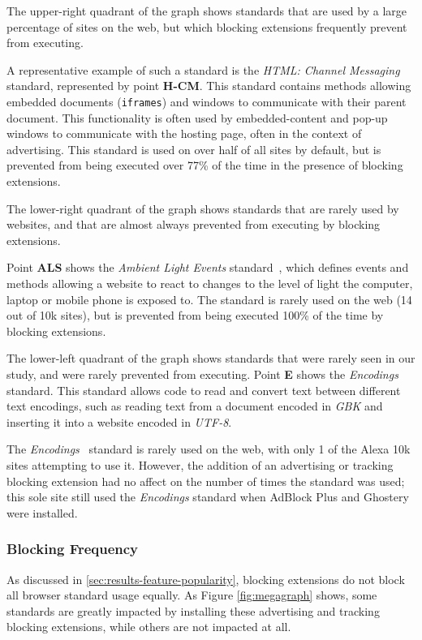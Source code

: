 The upper-right quadrant of the graph shows standards that are used by a
large percentage of sites on the web, but which blocking extensions frequently
prevent from executing.

A representative example of such a standard is the \textit{HTML: Channel Messaging}
~\cite{htmlcmw3c} standard, represented by point \textbf{H-CM}.  This standard
contains \JS methods allowing embedded documents (\texttt{iframes}) and windows
to communicate with their parent document.  This functionality is often used
by embedded-content and pop-up windows to communicate with the hosting page,
often in the context of advertising.  This standard is used on over half of
all sites by default, but is prevented from being executed over 77\% of the
time in the presence of blocking extensions.

The lower-right quadrant of the graph shows standards that are rarely used by
websites, and that are almost always prevented from executing by blocking extensions.

Point \textbf{ALS} shows the \emph{Ambient Light Events}
standard~\cite{ambientlightapi}, which defines events and methods allowing
a website to react to changes to the level of light the computer, laptop
or mobile phone is exposed to.  The standard is rarely used on the web (14 out of
10k sites), but is prevented from being executed 100\% of the time by blocking
extensions.

The lower-left quadrant of the graph shows standards that were rarely seen
in our study, and were rarely prevented from executing.  Point \textbf{E}
shows the \emph{Encodings}~\cite{encodingw3c} standard.  This
standard allows \JS code to read and convert text between different text
encodings, such as reading text from a document encoded in \emph{GBK}
and inserting it into a website encoded in \emph{UTF-8}.

The \emph{Encodings}~\cite{encodingw3c} standard is rarely used on the web, with only 1 of the Alexa 10k sites
attempting to use it.  However, the addition of an advertising or
tracking blocking extension had no affect on the number of times the standard
was used; this sole site still used the \emph{Encodings} standard when
AdBlock Plus and Ghostery were installed.


\subsubsection{Blocking Frequency}
As discussed in \ref{sec:results-feature-popularity}, blocking extensions do
not block all browser standard usage equally.
As Figure \ref{fig:megagraph} shows, some standards are greatly impacted by
installing these advertising and tracking blocking extensions, while others
are not impacted at all.


